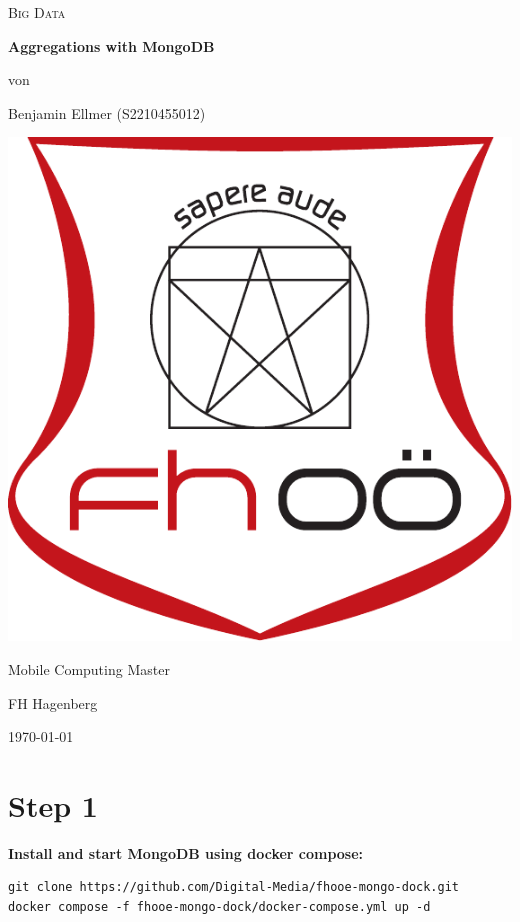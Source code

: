 \documentclass[14pt,a4paper]{extarticle}
\begin{document}
	\begin{titlepage}
		\centering
		{\scshape\LARGE Big Data \par}
		\vspace{2.5cm}
		{\huge\bfseries Aggregations with MongoDB}
		\vfill
		{\normalsize von\par}
		{\normalsize Benjamin Ellmer (\textsc{S2210455012}) \par}
		\vspace{1cm}
		\includegraphics[width=0.3\textheight]{images/logo.pdf} \par
		\vspace{1cm}
		{\large Mobile Computing Master \par}
		{\large FH Hagenberg \par}
		\vfill
		{\large \today\par}
	\end{titlepage}

	\section*{Step 1}
	\noindent \textbf{Install and start MongoDB using docker compose:}
	\begin{lstlisting}[style=fish]
git clone https://github.com/Digital-Media/fhooe-mongo-dock.git 
docker compose -f fhooe-mongo-dock/docker-compose.yml up -d
	\end{lstlisting}
\end{document}
